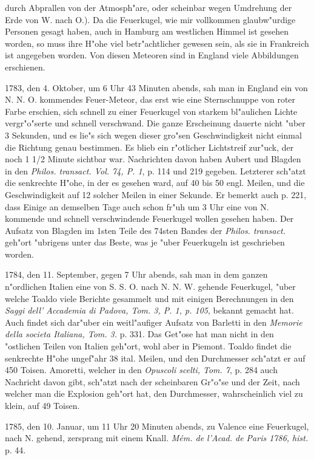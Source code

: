 \documentclass[a4paper, 11pt, oneside, polutonikogreek, german]{article}
\begin{document}
durch Abprallen von der Atmosph"are, oder scheinbar wegen Umdrehung der Erde von W. nach O.). Da die Feuerkugel, wie mir vollkommen glaubw"urdige Personen gesagt haben, auch in Hamburg am westlichen Himmel ist gesehen worden, so muss ihre H"ohe viel betr"achtlicher gewesen sein, als sie in Frankreich ist angegeben worden. Von diesen Meteoren sind in England viele Abbildungen erschienen.

1783, den 4. Oktober, um 6 Uhr 43 Minuten abends, sah man in England ein von N. N. O. kommendes Feuer-Meteor, das erst wie eine Sternschnuppe von roter Farbe erschien, sich schnell zu einer Feuerkugel von starkem bl"aulichen Lichte vergr"o"serte und schnell verschwand. Die ganze Erscheinung dauerte nicht "uber 3 Sekunden, und es lie"s sich wegen dieser gro"sen Geschwindigkeit nicht einmal die Richtung genau bestimmen. Es blieb ein r"otlicher Lichtstreif zur"uck, der noch 1 1/2 Minute sichtbar war. Nachrichten davon haben Aubert und Blagden in den \emph{Philos. transact. Vol. 74, P. 1}, p. 114 und 219 gegeben. Letzterer sch"atzt die senkrechte H"ohe, in der es gesehen ward, auf 40 bis 50 engl. Meilen, und die Geschwindigkeit auf 12 solcher Meilen in einer Sekunde. Er bemerkt auch p. 221, dass Einige an demselben Tage auch schon fr"uh um 3 Uhr eine von N. kommende und schnell verschwindende Feuerkugel wollen gesehen haben. Der Aufsatz von Blagden im 1sten Teile des 74sten Bandes der \emph{Philos. transact.} geh"ort "ubrigens unter das Beste, was je "uber Feuerkugeln ist geschrieben worden.

1784, den 11. September, gegen 7 Uhr abends, sah man in dem ganzen n"ordlichen Italien eine von S. S. O. nach N. N. W. gehende Feuerkugel, "uber welche Toaldo viele Berichte gesammelt und mit einigen Berechnungen in den \emph{Saggi dell' Accademia di Padova, Tom. 3, P. 1, p. 105}, bekannt gemacht hat. Auch findet sich dar"uber ein weitl"aufiger Aufsatz von Barletti in den \emph{Memorie della societa Italiana, Tom. 3.} p. 331. Das Get"ose hat man nicht in den "ostlichen Teilen von Italien geh"ort, wohl aber in Piemont. Toaldo findet die senkrechte H"ohe ungef"ahr 38 ital. Meilen, und den Durchmesser sch"atzt er auf 450 Toisen. Amoretti, welcher in den \emph{Opuscoli scelti, Tom. 7}, p. 284 auch Nachricht davon gibt, sch"atzt nach der scheinbaren Gr"o"se und der Zeit, nach welcher man die Explosion geh"ort hat, den Durchmesser, wahrscheinlich viel zu klein, auf 49 Toisen.

1785, den 10. Januar, um 11 Uhr 20 Minuten abends, zu Valence eine Feuerkugel, nach N. gehend, zersprang mit einem Knall. \emph{Mém. de l'Acad. de Paris 1786, hist.} p. 44.
\end{document}
